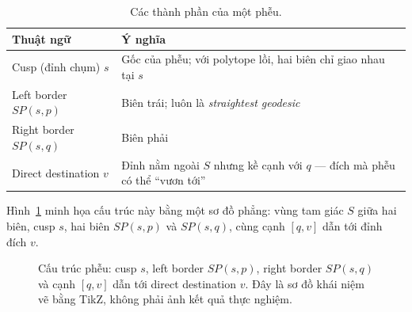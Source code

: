 \begin{table}[!t]
  \caption{Các thành phần của một phễu.}
  \label{tab:thanh-phan-funnel}
  {\fontsize{7}{9.3}\selectfont
  \begin{tabular}{@{}>{\raggedright\arraybackslash}p{58pt}>{\raggedright\arraybackslash}p{126pt}@{}}
    \toprule
    \textbf{Thuật ngữ} & \textbf{Ý nghĩa} \\
    \midrule
    Cusp (đỉnh chụm) $s$ & Gốc của phễu; với polytope lồi, hai biên chỉ giao nhau
      tại $s$ \\
    Left border $SP(s,p)$ & Biên trái; luôn là \emph{straightest geodesic} \\
    Right border $SP(s,q)$ & Biên phải \\
    Direct destination $v$ & Đỉnh nằm ngoài $S$ nhưng kề cạnh với $q$ --- đích mà
      phễu có thể ``vươn tới'' \\
    \bottomrule
  \end{tabular}}
\end{table}

Hình~\ref{fig:funnel-cusp} minh họa cấu trúc này bằng một sơ đồ phẳng: vùng tam
giác $S$ giữa hai biên, cusp $s$, hai biên $SP(s,p)$ và $SP(s,q)$, cùng cạnh
$[q,v]$ dẫn tới đỉnh đích $v$.

\begin{figure}[!t]
  \centering
  \caption{Cấu trúc phễu: cusp $s$, left border $SP(s,p)$, right border $SP(s,q)$
    và cạnh $[q,v]$ dẫn tới direct destination $v$. Đây là sơ đồ khái niệm vẽ bằng TikZ,
    không phải ảnh kết quả thực nghiệm.}
  \label{fig:funnel-cusp}
\end{figure}

